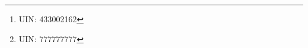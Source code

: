 %


\author{%
  Shao-Ting Chiu\thanks{UIN: 433002162} \\
  Department of Electrical and Computer Engineering\\
  Texas A\&M University\\
  College Station, TX 77843 \\
  \texttt{stchiu@tamu.edu} \\
  Chan-Min Hsu\thanks{UIN: 777777777} \\
  Department of Electrical and Computer Engineering\\
  Texas A\&M University\\
  College Station, TX 77843 \\
  \texttt{chanminhsu@tamu.edu} \\
}